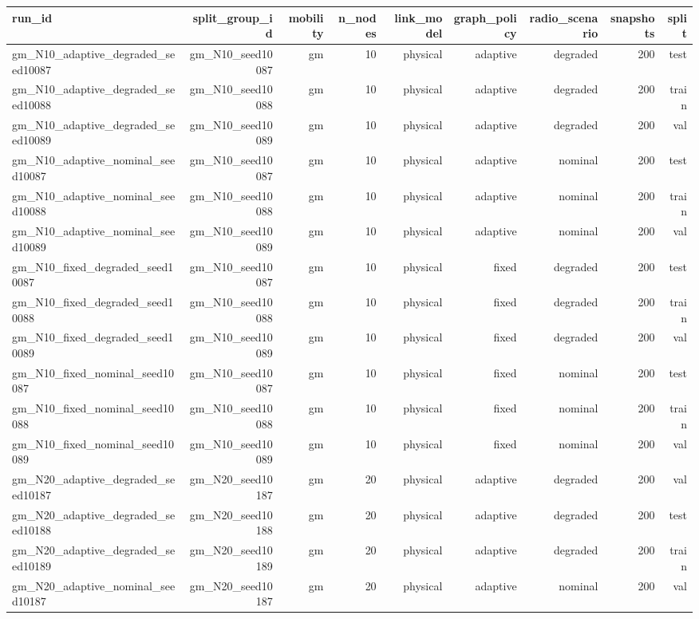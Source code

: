 \begin{tabular}{lrrrrrrrr}
\toprule
run\_id & split\_group\_id & mobility & n\_nodes & link\_model & graph\_policy & radio\_scenario & snapshots & split \\
\midrule
gm\_N10\_adaptive\_degraded\_seed10087 & gm\_N10\_seed10087 & gm & 10 & physical & adaptive & degraded & 200 & test \\
gm\_N10\_adaptive\_degraded\_seed10088 & gm\_N10\_seed10088 & gm & 10 & physical & adaptive & degraded & 200 & train \\
gm\_N10\_adaptive\_degraded\_seed10089 & gm\_N10\_seed10089 & gm & 10 & physical & adaptive & degraded & 200 & val \\
gm\_N10\_adaptive\_nominal\_seed10087 & gm\_N10\_seed10087 & gm & 10 & physical & adaptive & nominal & 200 & test \\
gm\_N10\_adaptive\_nominal\_seed10088 & gm\_N10\_seed10088 & gm & 10 & physical & adaptive & nominal & 200 & train \\
gm\_N10\_adaptive\_nominal\_seed10089 & gm\_N10\_seed10089 & gm & 10 & physical & adaptive & nominal & 200 & val \\
gm\_N10\_fixed\_degraded\_seed10087 & gm\_N10\_seed10087 & gm & 10 & physical & fixed & degraded & 200 & test \\
gm\_N10\_fixed\_degraded\_seed10088 & gm\_N10\_seed10088 & gm & 10 & physical & fixed & degraded & 200 & train \\
gm\_N10\_fixed\_degraded\_seed10089 & gm\_N10\_seed10089 & gm & 10 & physical & fixed & degraded & 200 & val \\
gm\_N10\_fixed\_nominal\_seed10087 & gm\_N10\_seed10087 & gm & 10 & physical & fixed & nominal & 200 & test \\
gm\_N10\_fixed\_nominal\_seed10088 & gm\_N10\_seed10088 & gm & 10 & physical & fixed & nominal & 200 & train \\
gm\_N10\_fixed\_nominal\_seed10089 & gm\_N10\_seed10089 & gm & 10 & physical & fixed & nominal & 200 & val \\
gm\_N20\_adaptive\_degraded\_seed10187 & gm\_N20\_seed10187 & gm & 20 & physical & adaptive & degraded & 200 & val \\
gm\_N20\_adaptive\_degraded\_seed10188 & gm\_N20\_seed10188 & gm & 20 & physical & adaptive & degraded & 200 & test \\
gm\_N20\_adaptive\_degraded\_seed10189 & gm\_N20\_seed10189 & gm & 20 & physical & adaptive & degraded & 200 & train \\
gm\_N20\_adaptive\_nominal\_seed10187 & gm\_N20\_seed10187 & gm & 20 & physical & adaptive & nominal & 200 & val \\

\end{tabular}
